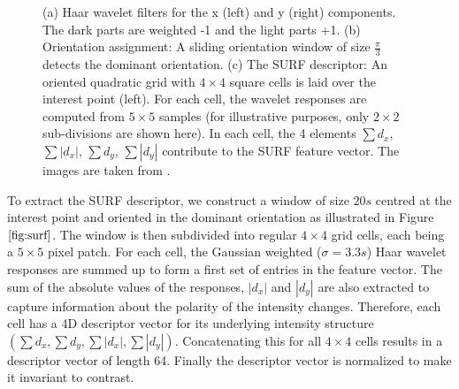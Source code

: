\documentclass{SMBV13}
\begin{document}
\begin{figure}[htbp]
    \centering
    \caption{(a) Haar wavelet filters for the x (left) and y (right) components. The dark parts are weighted -1 and the light parts +1. (b) Orientation assignment: A sliding orientation window of size $\frac{\pi}{3}$ detects the dominant orientation. (c) The SURF descriptor: An oriented quadratic grid with $4 \times 4$ square cells is laid over the interest point (left). For each cell, the wavelet responses are computed from $5 \times 5$ samples (for illustrative purposes, only $2 \times 2$ sub-divisions are shown here). In each cell, the 4 elements $\sum d_x$, $\sum \left| d_x \right|$, $\sum d_y$, $\sum \left| d_y \right| $ contribute to the SURF feature vector. The images are taken from \cite{bay2006surf}.} 
\end{figure}

To extract the SURF descriptor, we construct a window of size $20s$ centred at the interest point and oriented in the dominant orientation as illustrated in Figure $\ref{fig:surf}$. The window is then subdivided into regular $4 \times 4$ grid cells, each being a $5 \times 5$ pixel patch. For each cell, the Gaussian weighted ($\sigma = 3.3s$) Haar wavelet responses are summed up to form a first set of entries in the feature vector. The sum of the absolute values of the responses, $\left| d_x \right| $ and $\left| d_y \right| $ are also extracted to capture information about the polarity of the intensity changes. Therefore, each cell has a 4D descriptor vector for its underlying intensity structure $\left( \sum d_x, \sum d_y, \sum \left| d_x \right| , \sum \left| d_y \right|  \right)$. Concatenating this for all $4 \times 4$ cells results in a descriptor vector of length 64. Finally the descriptor vector is normalized to make it invariant to contrast.
\end{document}
